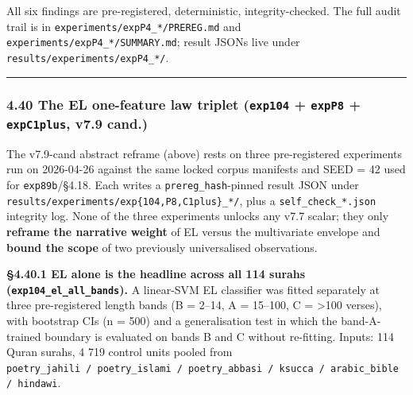 \documentclass[
]{article}
\begin{document}
All six findings are pre-registered, deterministic, integrity-checked.
The full audit trail is in \texttt{experiments/expP4\_*/PREREG.md} and
\texttt{experiments/expP4\_*/SUMMARY.md}; result JSONs live under
\texttt{results/experiments/expP4\_*/}.

\begin{center}\rule{0.5\linewidth}{0.5pt}\end{center}

\subsubsection{\texorpdfstring{4.40 The EL one-feature law triplet
(\texttt{exp104} + \texttt{expP8} + \texttt{expC1plus}, v7.9
cand.)}{4.40 The EL one-feature law triplet (exp104 + expP8 + expC1plus, v7.9 cand.)}}\label{the-el-one-feature-law-triplet-exp104-expp8-expc1plus-v7.9-cand.}

The v7.9-cand abstract reframe (above) rests on three pre-registered
experiments run on 2026-04-26 against the same locked corpus manifests
and SEED = 42 used for \texttt{exp89b}/§4.18. Each writes a
\texttt{prereg\_hash}-pinned result JSON under
\texttt{results/experiments/exp\{104,P8,C1plus\}\_*/}, plus a
\texttt{self\_check\_*.json} integrity log. None of the three
experiments unlocks any v7.7 scalar; they only \textbf{reframe the
narrative weight} of EL versus the multivariate envelope and
\textbf{bound the scope} of two previously universalised observations.

\textbf{§4.40.1 EL alone is the headline across all 114 surahs
(\texttt{exp104\_el\_all\_bands}).} A linear-SVM EL classifier was
fitted separately at three pre-registered length bands (B = 2--14, A =
15--100, C = \textgreater100 verses), with bootstrap CIs (n = 500) and a
generalisation test in which the band-A-trained boundary is evaluated on
bands B and C without re-fitting. Inputs: 114 Quran surahs, 4 719
control units pooled from
\texttt{poetry\_jahili\ /\ poetry\_islami\ /\ poetry\_abbasi\ /\ ksucca\ /\ arabic\_bible\ /\ hindawi}.
\end{document}
